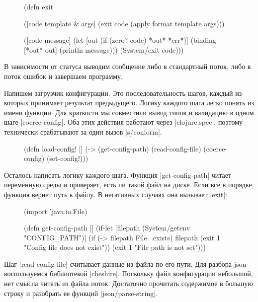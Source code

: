 \begin{figure}[!ht]
\begin{code}
(defn exit

  ([code template & args]
   (exit code (apply format template args)))

  ([code message]
   (let [out (if (zero? code) *out* *err*)]
     (binding [*out* out]
       (println message)))
   (System/exit code)))
\end{code}
\end{figure}

В зависимости от статуса выводим сообщение либо в стандартный поток, либо в
поток ошибок и завершаем программу.

Напишем загрузчик конфигурации. Это последовательность шагов, каждый из которых
принимает результат предыдущего. Логику каждого шага легко понять из имени
функции. Для краткости мы совместили вывод типов и валидацию в одном шаге
\spverb|coerce-config|. Оба этих действия работают через \spverb|clojure.spec|, поэтому
технически срабатывают за один вызов \spverb|s/conform|.

\begin{figure}[!ht]
\begin{code}
(defn load-config!
  []
  (-> (get-config-path)
      (read-config-file)
      (coerce-config)
      (set-config!)))
\end{code}
\end{figure}

Осталось написать логику каждого шага. Функция \spverb|get-config-path| читает
переменную среды и проверяет, есть ли такой файл на диске. Если все в порядке,
функция вернет путь к файлу. В негативных случаях она вызывает \spverb|exit|:

\begin{figure}[!ht]
\begin{code}
(import 'java.io.File)

(defn get-config-path
  []
  (if-let [filepath (System/getenv "CONFIG_PATH")]
    (if (-> filepath File. .exists)
      filepath
      (exit 1 "Config file does not exist"))
    (exit 1 "File path is not set")))
\end{code}
\end{figure}

Шаг \spverb|read-config-file| считывает данные из файла по его пути. Для разбора json
воспользуемся библиотекой \spverb|cheshire|. Поскольку файл конфигурации небольшой, нет
смысла читать из файла поток. Достаточно прочитать содержимое в большую строку и
разобрать ее функций \spverb|json/parse-string|.

